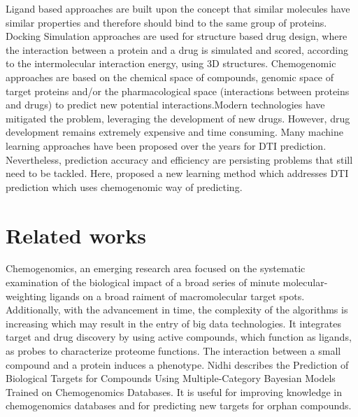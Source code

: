 \documentclass[conference]{IEEEtran}
\begin{document}
Ligand based approaches are built upon the concept that similar molecules have similar properties and therefore should bind to the same group of proteins. Docking Simulation approaches are used for structure based drug design, where the interaction between a protein and a drug is simulated and scored, according to the intermolecular interaction energy, using 3D structures. Chemogenomic approaches are based on the chemical space of compounds, genomic space of target proteins and/or the pharmacological space (interactions between proteins and drugs) to predict new potential interactions.Modern technologies have mitigated the problem, leveraging the development of new drugs. However, drug development remains extremely expensive and time consuming. Many machine learning approaches have been proposed over the years for DTI prediction. Nevertheless, prediction accuracy and efficiency are persisting problems that still need to be tackled. Here, proposed a new learning method which addresses DTI prediction which uses chemogenomic way of predicting.

\section{Related works}
Chemogenomics, an emerging research area focused on the systematic examination of the biological impact of a broad series of minute molecular-weighting ligands on a broad raiment of macromolecular target spots. Additionally, with the advancement in time, the complexity of the algorithms is increasing which may result in the entry of big data technologies. It integrates target and drug discovery by using active compounds, which function as ligands, as probes to characterize proteome functions. The interaction between a small compound and a protein induces a phenotype. Nidhi \cite{b9} describes the Prediction of Biological Targets for Compounds Using Multiple-Category Bayesian Models Trained on Chemogenomics Databases. It is useful for improving knowledge in chemogenomics databases and for predicting new targets for orphan compounds.
\end{document}
